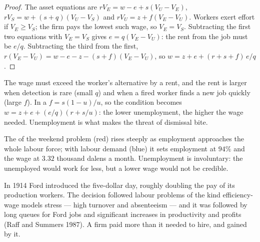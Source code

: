 \begin{proof}
The asset equations are $rV_E = w - e + s(V_U - V_E)$, $rV_S = w + (s + q)(V_U - V_S)$ and
$rV_U = z + f(V_E - V_U)$. Workers exert effort if $V_E \ge V_S$; the firm pays the
lowest such wage, so $V_E = V_S$. Subtracting the first two equations with
$V_E = V_S$ gives $e = q(V_E - V_U)$: the rent from the job must be $e/q$. Subtracting the
third from the first, $r(V_E - V_U) = w - e - z - (s + f)(V_E - V_U)$, so
$w = z + e + (r + s + f)\,e/q$.
\end{proof}

The wage must exceed the worker's alternative by a rent, and the rent is
larger when detection is rare (small $q$) and when a fired worker finds a
new job quickly (large $f$). In a  $f = s(1 - u)/u$, so the condition
becomes $w = z + e + (e/q)(r + s/u)$: the lower unemployment, the higher the wage
needed. Unemployment is what makes the threat of dismissal bite.

\begin{omfigure}

{\small The  of the weekend problem (red) rises steeply
as employment approaches the whole labour force; with labour demand
(blue) it sets employment at $94\%$ and the wage at $3.32$ thousand dalens a
month. Unemployment is involuntary: the unemployed would work for less,
but a lower wage would not be credible.}
\end{omfigure}

\begin{record}
In 1914 Ford introduced the five-dollar day, roughly doubling the pay of
its production workers. The decision followed labour problems of the kind
efficiency-wage models stress --- high turnover and absenteeism --- and it
was followed by long queues for Ford jobs and significant increases in
productivity and profits (Raff and Summers 1987). %
A firm paid more than it needed to hire, and gained by it.
\end{record}

